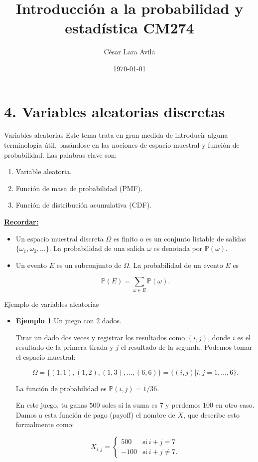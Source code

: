 \documentclass[10pt]{beamer}
\title{Introducci\'on a la probabilidad y estad\'istica CM274}
\date{\today}
\author{C\'esar Lara Avila}
\institute{\url{https://github.com/C-Lara}}
\begin{document}
  \maketitle
  \section{4. Variables aleatorias discretas }
  
\begin{frame}{Variables aleatorias}
Este tema trata en gran medida de introducir alguna terminolog\'ia \'util, bas\'andose en las nociones de espacio muestral y funci\'on de probabilidad. Las palabras clave son:

\begin{enumerate}
	\item Variable aleatoria.
	\item Funci\'on de masa de probabilidad (PMF).
	\item Funci\'on de distribuci\'on acumulativa (CDF).
\end{enumerate}

\vspace{0.2cm}

\textbf{\small{\underline{Recordar:}}}
\begin{itemize}
	\item \scriptsize{Un espacio muestral discreta $\Omega$ es finito o es un conjunto listable de salidas $\{\omega_1, \omega_2, \dots\}$. La probabilidad de una salida $\omega$ es denotada por $\mathbb{P}(\omega)$}.
	\item Un evento $E$ es un subconjunto de $\Omega$. La probabilidad de un evento $E$ es
	
	\[
	 \mathbb{P}(E) = \sum_{\omega \in E}\mathbb{P}(\omega).
	 \]
\end{itemize}
\end{frame}
 \begin{frame}{Ejemplo de variables aleatorias}
\begin{itemize}
	\item \small {\textbf{Ejemplo 1} Un juego  con $2$ dados.
	
	Tirar un dado dos veces y registrar los resultados como $(i, j)$, donde $i$ es el resultado de la primera tirada y $j$ el resultado de la segunda. Podemos tomar el espacio muestral:
	
	\[
	\Omega =\{ (1,1),(1,2),(1, 3), \dots, (6,6)\} = \{(i,j)|i,j = 1, \dots, 6\}.
	\]
	
La funci\'on de probabilidad  es $\mathbb{P}(i,j) = 1/36$. 	

\vspace{0.2cm}

En este juego, tu ganas $500$ soles si la suma es $7$ y perdemos $100$ en otro caso. Damos a esta funci\'on de pago (payoff) el nombre de $X$, que describe esto formalmente como:

\[
X_{i,j} = \begin{cases}
500 & \text{si}\ i + j = 7\\
-100 & \text{si}\ i + j \neq 7.
\end{cases}
\]
}
\end{itemize}
\end{frame}
\end{document}
